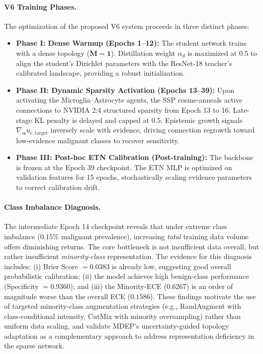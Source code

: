 \documentclass[letterpaper]{article} %
\begin{document}
\paragraph{V6 Training Phases.}
The optimization of the proposed V6 system proceeds in three distinct phases:
\begin{itemize}
    \item \textbf{Phase I: Dense Warmup (Epochs 1--12):} The student network trains with a dense topology ($\bm{M} = \bm{1}$). Distillation weight $\alpha_d$ is maximized at $0.5$ to align the student's Dirichlet parameters with the ResNet-18 teacher's calibrated landscape, providing a robust initialization.
    \item \textbf{Phase II: Dynamic Sparsity Activation (Epochs 13--39):} Upon activating the Microglia--Astrocyte agents, the SSP cosine-anneals active connections to NVIDIA 2:4 structured sparsity from Epoch 13 to 16. Late-stage KL penalty is delayed and capped at $0.5$. Epistemic growth signals $\nabla_{\bm{\alpha}} u_{e,\text{target}}$ inversely scale with evidence, driving connection regrowth toward low-evidence malignant classes to recover sensitivity.
    \item \textbf{Phase III: Post-hoc ETN Calibration (Post-training):} The backbone is frozen at the Epoch 39 checkpoint. The ETN MLP is optimized on validation features for 15 epochs, stochastically scaling evidence parameters to correct calibration drift.
\end{itemize}

\paragraph{Class Imbalance Diagnosis.} The intermediate Epoch 14 checkpoint reveals that under extreme class imbalance ($0.15\%$ malignant prevalence), increasing \emph{total} training data volume offers diminishing returns. The core bottleneck is not insufficient data overall, but rather insufficient \emph{minority-class} representation. The evidence for this diagnosis includes: (i) Brier Score $= 0.0383$ is already low, suggesting good overall probabilistic calibration; (ii) the model achieves high benign-class performance (Specificity $= 0.9360$); and (iii) the Minority-ECE ($0.6267$) is an order of magnitude worse than the overall ECE ($0.1586$). These findings motivate the use of targeted minority-class augmentation strategies (e.g., RandAugment with class-conditional intensity, CutMix with minority oversampling) rather than uniform data scaling, and validate MDEP's uncertainty-guided topology adaptation as a complementary approach to address representation deficiency in the sparse network.
\end{document}
